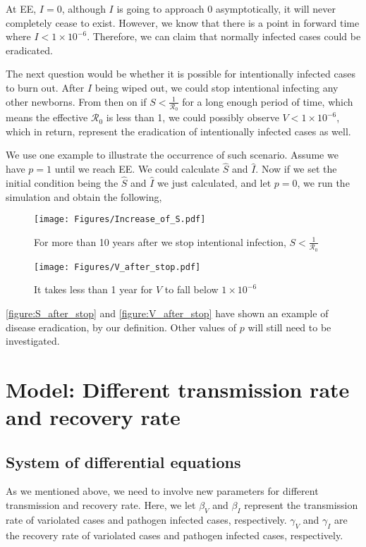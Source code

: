 \documentclass[12pt]{article}
\newcommand{\R}{\mathcal{R}}
\begin{document}
At EE, $I=0$, although $I$ is going to approach 0 asymptotically, it will never completely cease to exist. However, we know that there is a point in forward time where $I<1\times10^{-6}$. Therefore, we can claim that normally infected cases could be eradicated.

The next question would be whether it is possible for intentionally infected cases to burn out. After $I$ being wiped out, we could stop intentional infecting any other newborns. From then on if $S<\frac{1}{\R_0}$ for a long enough period of time, which means the effective $\R_0$ is less than 1, we could possibly observe $V<1\times10^{-6}$, which in return, represent the eradication of intentionally infected cases as well.

We use one example to illustrate the occurrence of such scenario. Assume we have $p=1$ until we reach EE. We could calculate $\hat{S}$ and $\hat{I}$. Now if we set the initial condition being the $\hat{S}$ and $\hat{I}$ we just calculated, and let $p=0$, we run the simulation and obtain the following,
\begin{figure}[H]
  \centering
  \texttt{[image: Figures/Increase\_of\_S.pdf]}
  \caption{For more than 10 years after we stop intentional infection, $S<\frac{1}{\R_0}$}
\label{figure:S_after_stop}
\end{figure}

\begin{figure}[H]
  \centering
  \texttt{[image: Figures/V\_after\_stop.pdf]}
  \caption{It takes less than 1 year for $V$ to fall below $1\times10^{-6}$}
\label{figure:V_after_stop}
\end{figure}

\autoref{figure:S_after_stop} and \autoref{figure:V_after_stop} have shown an example of disease eradication, by our definition. Other values of $p$ will still need to be investigated.

\section{Model: Different transmission rate and recovery rate}
\subsection{System of differential equations}
As we mentioned above, we need to involve new parameters for different transmission and recovery rate. Here, we let $\beta_V$ and $\beta_I$ represent the transmission rate of variolated cases and pathogen infected cases, respectively. $\gamma_V$ and $\gamma_I$ are the recovery rate of variolated cases and pathogen infected cases, respectively.
\end{document}
